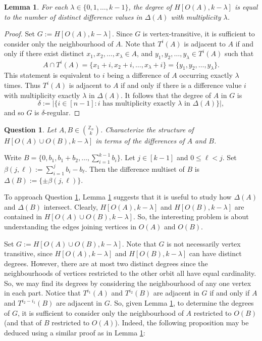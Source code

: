 \documentclass[12pt]{article}
\newcommand{\Z}{\mathbb{Z}}
\newtheorem{lem}{Lemma} %
\newtheorem{question}{Question}
\theoremstyle{definition}
\begin{document}
	\begin{lem}\label{Lemma-DegreeMultiplicities}
		For each $\lambda \in \{0,1, \ldots, k-1\}$, the degree of $H[O(A),k-\lambda]$ is equal to the number of distinct difference values in $\Delta(A)$ with multiplicity $\lambda$.
	\end{lem}
	\begin{proof}
		Set $G := H[O(A),k-\lambda]$.  Since $G$ is vertex-transitive, it is sufficient to consider only the neighbourhood of $A$.  Note that $T^i(A)$ is adjacent to $A$ if and only if there exist distinct $x_1, x_2, \ldots, x_\lambda \in A$, and $y_1, y_2, \ldots, y_\lambda \in T^i(A)$ such that 
		$$A \cap T^i(A) = \{x_1 + i, x_2 +i, \ldots, x_\lambda + i\} = \{y_1, y_2, \ldots, y_\lambda\}.$$
		This statement is equivalent to $i$ being a difference of $A$ occurring exactly $\lambda$ times.  Thus $T^i(A)$ is adjacent to $A$ if and only if there is a difference value $i$ with multiplicity exactly $\lambda$ in $\Delta(A)$.  It follows that the degree of $A$ in $G$ is 
		$$\delta := |\{i \in [n-1]: \text{$i$ has multiplicity exactly $\lambda$ in $\Delta(A)$}\}|,$$
		and so $G$ is $\delta$-regular. \qedhere
	\end{proof}

	\begin{question}\label{Question-OrbitUnionsCharacterization}
		Let $A, B \in {\Z_n \choose k}$.  Characterize the structure of $H[O(A) \cup O(B), k-\lambda]$ in terms of the differences of $A$ and $B$.
	\end{question}

	Write $B = \{0, b_1, b_1+b_2, \ldots, \sum_{i=1}^{k-1}b_i\}$.  Let $j \in [k-1]$ and $0 \leq \ell < j$.  Set $\beta(j,\ell) := \sum_{i=1}^{j}b_i - b_\ell$.  Then the difference multiset of $B$ is $\Delta(B) := \{\pm \beta(j,\ell)\}$.  
	
	To approach Question \ref{Question-OrbitUnionsCharacterization}, Lemma \ref{Lemma-DegreeMultiplicities} suggests that it is useful to study how $\Delta(A)$ and $\Delta(B)$ intersect.  Clearly, $H[O(A),k-\lambda]$ and $H[O(B),k-\lambda]$ are contained in $H[O(A) \cup O(B), k-\lambda]$. So, the interesting problem is about understanding the edges joining vertices in $O(A)$ and $O(B)$.
	
	Set $G := H[O(A) \cup O(B), k-\lambda]$.  Note that $G$ is not necessarily vertex transitive, since $H[O(A), k-\lambda]$ and $H[O(B),k-\lambda]$ can have distinct degrees.  However, there are at most two distinct degrees since the neighbourhoods of vertices restricted to the other orbit all have equal cardinality.  So, we may find its degrees by considering the neighbourhood of any one vertex in each part.  Notice that $T^{i_1}(A)$ and $T^{i_2}(B)$ are adjacent in $G$ if and only if $A$ and $T^{i_2-i_1}(B)$ are adjacent in $G$.  So, given Lemma \ref{Lemma-DegreeMultiplicities}, to determine the degrees of $G$, it is sufficient to consider only the neighbourhood of $A$ restricted to $O(B)$ (and that of $B$ restricted to $O(A)$).  Indeed, the following proposition may be deduced using a similar proof as in Lemma \ref{Lemma-DegreeMultiplicities}:
	
\end{document}
